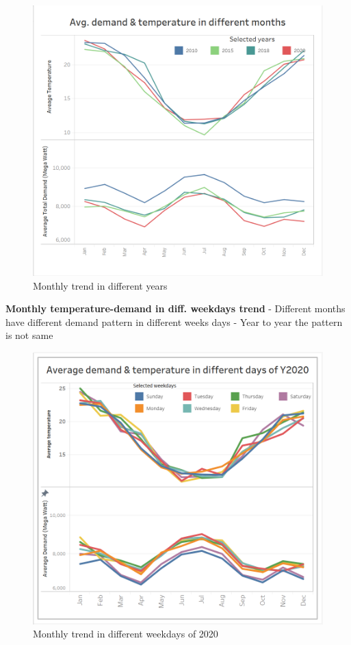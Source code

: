 \documentclass[mstat,12pt]{unswthesis}
\begin{document}
\begin{figure}[H]
\includegraphics{snapshots1/Monthly trend in different years.png}
\caption{Monthly trend in different years}\label{4.1}
\end{figure}

\textbf{Monthly temperature-demand in diff. weekdays trend} \newline
\newline - Different months have different demand pattern in different
weeks days \newline - Year to year the pattern is not same \newline

\begin{figure}[H]
\includegraphics{snapshots1/Monthly trend in different weekdays of Y2020.png}
\caption{Monthly trend in different weekdays of 2020}\label{4.2}
\end{figure}
\end{document}

